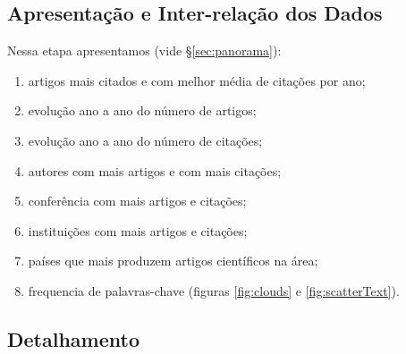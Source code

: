 \documentclass[sigconf]{acmart}
\begin{document}
\subsection{Apresentação e Inter-relação dos Dados}\label{inter}
Nessa etapa apresentamos (vide \S\ref{sec:panorama}):
\begin{enumerate}
  \item artigos mais citados e com melhor média de citações por ano;
  \item evolução ano a ano do número de artigos;
  \item evolução ano a ano do número de citações;
  \item autores com mais artigos e com mais citações;
  \item conferência com mais artigos e citações;
  \item instituições com mais artigos e citações;
  \item países que mais produzem artigos científicos na área;
  \item frequencia de palavras-chave (figuras \ref{fig:clouds} e \ref{fig:scatterText}).
\end{enumerate}
\subsection{Detalhamento}\label{detalha}
\end{document}
